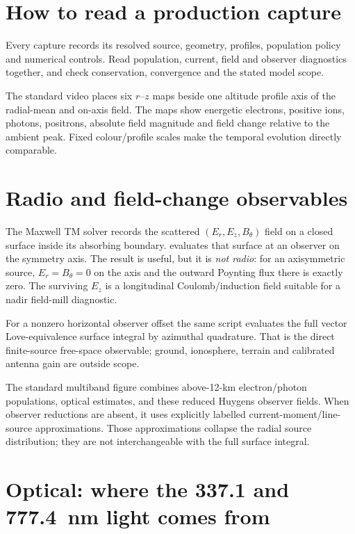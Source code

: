 \documentclass[11pt]{article}
\begin{document}
\section{How to read a production capture}

Every capture records its resolved source, geometry, profiles, population
policy and numerical controls. Read population, current, field and observer
diagnostics together, and check conservation, convergence and the stated model
scope.

The standard video places six $r$--$z$ maps beside one altitude profile axis
of the radial-mean and on-axis field. The maps show energetic
electrons, positive ions, photons, positrons, absolute field magnitude and
field change relative to the ambient peak. Fixed colour/profile scales make
the temporal evolution directly comparable.

\section{Radio and field-change observables}
\label{sec:radio}

The Maxwell TM solver records the scattered
$(E_r,E_z,B_\theta)$ field on a closed surface inside its absorbing boundary.
 evaluates that surface at an observer
on the symmetry axis. The result is useful, but it is \emph{not radio}: for an
axisymmetric source, $E_r=B_\theta=0$ on the axis and the outward Poynting flux
there is exactly zero. The surviving $E_z$ is a longitudinal Coulomb/induction
field suitable for a nadir field-mill diagnostic.

For a nonzero horizontal observer offset the same script evaluates the full
vector Love-equivalence surface integral by azimuthal quadrature. That is the
direct finite-source free-space observable; ground, ionosphere, terrain and
calibrated antenna gain are outside scope.

The standard multiband figure combines above-12-km electron/photon populations,
optical estimates, and these reduced Huygens observer fields. When observer
reductions are absent, it uses explicitly labelled current-moment/line-source
approximations. Those approximations collapse the radial source distribution;
they are not interchangeable with the full surface integral.

\section{Optical: where the 337.1 and 777.4~nm light comes from}
\end{document}
